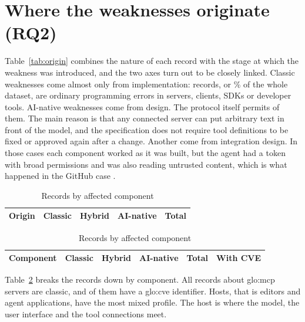 \section{Where the weaknesses originate (RQ2)}

\par Table~\ref{tab:origin} combines the nature of each record with the stage at which the weakness was introduced, and the two axes turn out to be closely linked. Classic weaknesses come almost only from implementation: \nImplClassic{} records, or \pImplClassic\% of the whole dataset, are ordinary programming errors in servers, clients, SDKs or developer tools. AI-native weaknesses come from design. The protocol itself permits \nNativeProtocol{} of them. The main reason is that any connected server can put arbitrary text in front of the model, and the specification does not require tool definitions to be fixed or approved again after a change. Another \nNativeIntegration{} come from integration design. In those cases each component worked as it was built, but the agent had a token with broad permissions and was also reading untrusted content, which is what happened in the GitHub case \cite{invariant2025github}.

\begin{table}[!htb]
\setlength{\tabcolsep}{3pt}
\begin{minipage}[t]{0.46\textwidth}
\centering
\caption{Records by origin and nature}
\label{tab:origin}
\footnotesize
\begin{tabular}{@{} l c c c c @{}}
\toprule
\textbf{Origin} & \textbf{Classic} & \textbf{Hybrid} & \textbf{AI-native} & \textbf{Total} \\
\midrule

\end{tabular}
\end{minipage}\hfill
\begin{minipage}[t]{0.52\textwidth}
\centering
\caption{Records by affected component}
\label{tab:component}
\footnotesize
\begin{tabular}{@{} l c c c c c @{}}
\toprule
\textbf{Component} & \textbf{Classic} & \textbf{Hybrid} & \textbf{AI-native} & \textbf{Total} & \textbf{With CVE} \\
\midrule

\end{tabular}
\end{minipage}
\end{table}

\par Table~\ref{tab:component} breaks the records down by component. All \nServer{} records about \acrshort{glo:mcp} servers are classic, and \nServerCve{} of them have a \acrshort{glo:cve} identifier. Hosts, that is editors and agent applications, have the most mixed profile. The host is where the model, the user interface and the tool connections meet.

